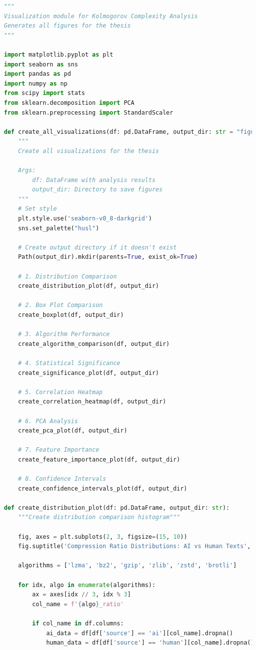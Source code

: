 \documentclass[12pt,a4paper]{report}
\begin{document}
\begin{lstlisting}[language=Python, caption=Visualization Generation]
"""
Visualization module for Kolmogorov Complexity Analysis
Generates all figures for the thesis
"""

import matplotlib.pyplot as plt
import seaborn as sns
import pandas as pd
import numpy as np
from scipy import stats
from sklearn.decomposition import PCA
from sklearn.preprocessing import StandardScaler

def create_all_visualizations(df: pd.DataFrame, output_dir: str = "figures"):
    """
    Create all visualizations for the thesis

    Args:
        df: DataFrame with analysis results
        output_dir: Directory to save figures
    """
    # Set style
    plt.style.use('seaborn-v0_8-darkgrid')
    sns.set_palette("husl")

    # Create output directory if it doesn't exist
    Path(output_dir).mkdir(parents=True, exist_ok=True)

    # 1. Distribution Comparison
    create_distribution_plot(df, output_dir)

    # 2. Box Plot Comparison
    create_boxplot(df, output_dir)

    # 3. Algorithm Performance
    create_algorithm_comparison(df, output_dir)

    # 4. Statistical Significance
    create_significance_plot(df, output_dir)

    # 5. Correlation Heatmap
    create_correlation_heatmap(df, output_dir)

    # 6. PCA Analysis
    create_pca_plot(df, output_dir)

    # 7. Feature Importance
    create_feature_importance_plot(df, output_dir)

    # 8. Confidence Intervals
    create_confidence_intervals_plot(df, output_dir)

def create_distribution_plot(df: pd.DataFrame, output_dir: str):
    """Create distribution comparison histogram"""

    fig, axes = plt.subplots(2, 3, figsize=(15, 10))
    fig.suptitle('Compression Ratio Distributions: AI vs Human Texts', fontsize=16)

    algorithms = ['lzma', 'bz2', 'gzip', 'zlib', 'zstd', 'brotli']

    for idx, algo in enumerate(algorithms):
        ax = axes[idx // 3, idx % 3]
        col_name = f'{algo}_ratio'

        if col_name in df.columns:
            ai_data = df[df['source'] == 'ai'][col_name].dropna()
            human_data = df[df['source'] == 'human'][col_name].dropna()


\end{lstlisting}
\end{document}
